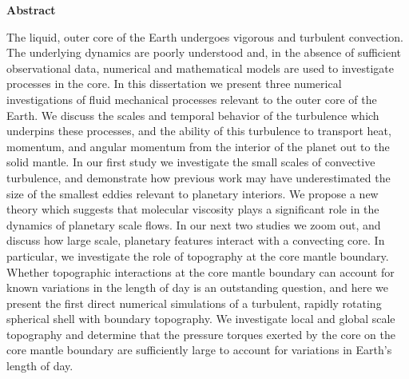 \begin{center}
	\textbf{Abstract}
\end{center}


The liquid, outer core of the Earth undergoes vigorous and turbulent convection. 
The underlying dynamics are poorly understood and, in the absence of sufficient observational data, numerical and mathematical models are used to investigate processes in the core. 
In this dissertation we present three numerical investigations of fluid mechanical processes relevant to the outer core of the Earth.
We discuss the scales and temporal behavior of the turbulence which underpins these processes, and the ability of this turbulence to transport heat, momentum, and angular momentum from the interior of the planet out to the solid mantle. 
In our first study we investigate the small scales of convective turbulence, and demonstrate how previous work may have underestimated the size of the smallest eddies relevant to planetary interiors. We propose a new theory which suggests that molecular viscosity plays a significant role in the dynamics of planetary scale flows.
In our next two studies we zoom out, and discuss how large scale, planetary features interact with a convecting core. In particular, we investigate the role of topography at the core mantle boundary. Whether topographic interactions at the core mantle boundary can account for known variations in the length of day is an outstanding question, and here we present the first direct numerical simulations of a turbulent, rapidly rotating spherical shell with boundary topography. We investigate local and global scale topography and determine that the pressure torques exerted by the core on the core mantle boundary are sufficiently large to account for variations in Earth's length of day.
